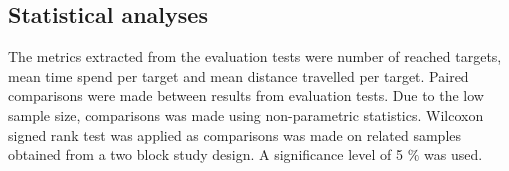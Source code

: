 \subsection{Statistical analyses}
The metrics extracted from the evaluation tests were number of reached targets, mean time spend per target and mean distance travelled per target. Paired comparisons were made between results from evaluation tests. Due to the low sample size, comparisons was made using non-parametric statistics. Wilcoxon signed rank test was applied as comparisons was made on related samples obtained from a two block study design. A significance level of 5 $\%$ was used.